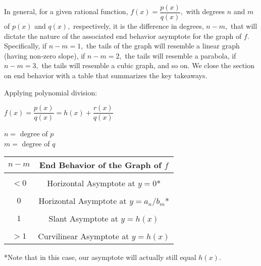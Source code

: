 \documentclass[12pt]{book}
\theoremstyle{definition}
\begin{document}
In general, for a given rational function, $f(x)=\dfrac{p(x)}{q(x)},$ with degrees $n$ and $m$ of $p(x)$ and $q(x),$ respectively, it is the difference in degrees, $n-m,$ that will dictate the nature of the associated end behavior asymptote for the graph of $f$.  Specifically, if $n-m=1,$ the tails of the graph will resemble a linear graph (having non-zero slope), if $n-m=2,$ the tails will resemble a parabola, if $n-m=3,$ the tails will resemble a cubic graph, and so on.
We close the section on end behavior with a table that summarizes the key takeaways.
\begin{multicols}{2}
Applying polynomial division:
\begin{center}
$f(x) = \dfrac{p(x)}{q(x)} = h(x)+\dfrac{r(x)}{q(x)}$
\par
$n=$ degree of $p$\\
$m=$ degree of $q$

\columnbreak

\begin{tabular}{c|c}
$n-m$ & End Behavior of the Graph of $f$ \\
\hline 
&\\
$<0$ & Horizontal Asymptote at $y=0$* \\
&\\
$0$ & Horizontal Asymptote at $y=a_n\slash b_m$*\\
&\\
$1$ & Slant Asymptote at $y=h(x)$\\
&\\
$>1$ & Curvilinear Asymptote at $y=h(x)$
\end{tabular}
\end{center}
\end{multicols}
*Note that in this case, our asymptote will actually still equal $h(x)$.
\end{document}
